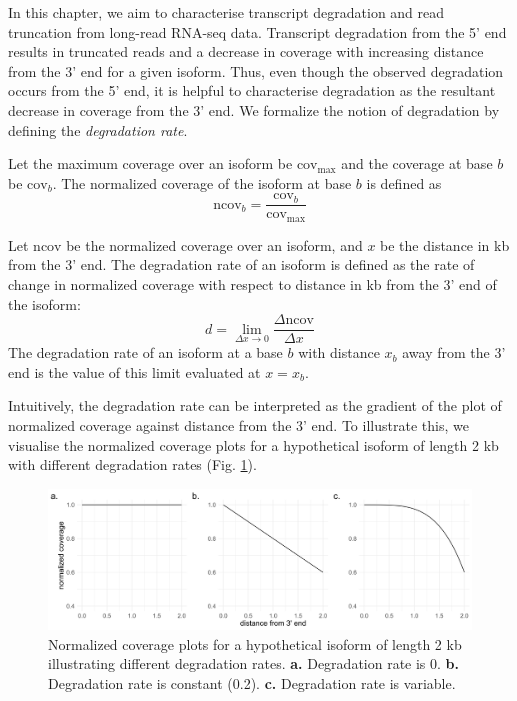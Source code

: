 
In this chapter, we aim to characterise transcript degradation and read truncation from long-read RNA-seq data. Transcript degradation from the 5' end results in truncated reads and a decrease in coverage with increasing distance from the 3' end for a given isoform. Thus, even though the observed degradation occurs from the 5' end, it is helpful to characterise degradation as the resultant decrease in coverage from the 3' end. We formalize the notion of degradation by defining the \textit{degradation rate}. 
\begin{definition}
Let the maximum coverage over an isoform be $\mathrm{cov}_{\mathrm{max}}$ and the coverage at base $b$ be $\mathrm{cov}_b$. The normalized coverage of the isoform at base $b$ is defined as 
\begin{equation}
    \mathrm{ncov}_b=\frac{\mathrm{cov}_b}{\mathrm{cov}_{\mathrm{max}}}
\end{equation}
\end{definition}
\begin{definition}
Let $\mathrm{ncov}$ be the normalized coverage over an isoform, and $x$ be the distance in kb from the 3' end. The degradation rate of an isoform is defined as the rate of change in normalized coverage with respect to distance in kb from the 3' end of the isoform:
\begin{equation}
    d=\lim_{\Delta x\rightarrow 0} \frac{\Delta \mathrm{ncov}}{\Delta x}
\end{equation}
The degradation rate of an isoform at a base $b$ with distance $x_b$ away from the 3' end is the value of this limit evaluated at $x=x_b$. 
\end{definition}
Intuitively, the degradation rate can be interpreted as the gradient of the plot of normalized coverage against distance from the 3' end. To illustrate this, we visualise the normalized coverage plots for a hypothetical isoform of length 2 kb with different degradation rates (Fig. \ref{fig:sec-2-hypo}).  
\begin{figure}[H]
    \centering
    \includegraphics[width=\textwidth]{figures/sec-2-hypo.png}
    \caption[Normalized coverage plots for a hypothetical isoform]{Normalized coverage plots for a hypothetical isoform of length 2 kb illustrating different degradation rates. \textbf{a.} Degradation rate is 0. \textbf{b.} Degradation rate is constant (0.2). \textbf{c.} Degradation rate is variable.}
    \label{fig:sec-2-hypo}
\end{figure}
